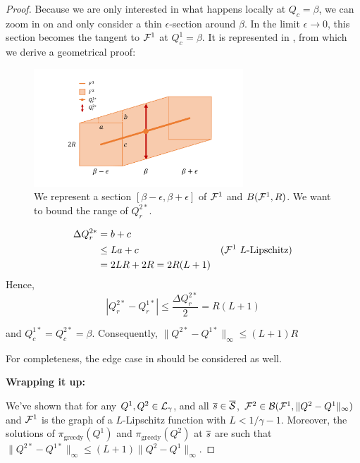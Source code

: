 \begin{proof}
Because we are only interested in what happens locally at $Q_c=\beta$, we can zoom in on  and only consider a thin $\epsilon$-section around $\beta$. In the limit $\epsilon\rightarrow 0$, this section becomes the tangent to $\mathcal{F}^1$ at $Q_c^1=\beta$. It is represented in , from which we derive a geometrical proof:
\begin{figure}[ht]
    \centering
    \includegraphics[trim=2cm 1cm 2cm 1cm, clip, width=0.7\textwidth]{source/img/contraction_lipschitz_slope.pdf}
    \caption{We represent a section $[\beta-\epsilon, \beta+\epsilon]$ of $\mathcal{F}^1$ and $B(\mathcal{F}^1, R)$. We want to bound the range of $Q_r^{2*}.$}
    \label{fig:contraction_lips_hull_slope}
\end{figure}

\begin{align*}
    \Delta Q_r^{2*} &= b + c &\\
    & \leq La + c & \text{($\mathcal{F}^1$ $L$-Lipschitz)}\\
    &= 2LR+2R = 2R(L+1)
\end{align*}
Hence,
\begin{equation*}
    | Q_r^{2*} - Q_r^{1*}| \leq \frac{\Delta Q_r^{2*}}{2} = R(L+1)
\end{equation*}

and $Q_c^{1*} = Q_c^{2*} = \beta$.
Consequently, $ \|Q^{2*} - Q^{1*}\|_\infty \leq (L+1)R$

For completeness, the edge case in  should be considered as well.

\textbf{Wrapping it up:}

We've shown that for any $Q^1,Q^2\in\mathcal{L}_\gamma$, and all $\overline{s}\in\overline{\mathcal{S}}$, $\mathcal{F}^2\in\mathcal{B}(\mathcal{F}^1,\|Q^2-Q^1\|_\infty)$ and $\mathcal{F}^1$ is the graph of a $L$-Lipschitz function with $L<1/\gamma - 1$. Moreover, the solutions of $\pi_\text{greedy}(Q^1)$ and $\pi_\text{greedy}(Q^2)$ at $\overline{s}$ are such that $ \|Q^{2*} - Q^{1*}\|_\infty \leq (L+1)\|Q^2-Q^1\|_\infty$.


\end{proof}

